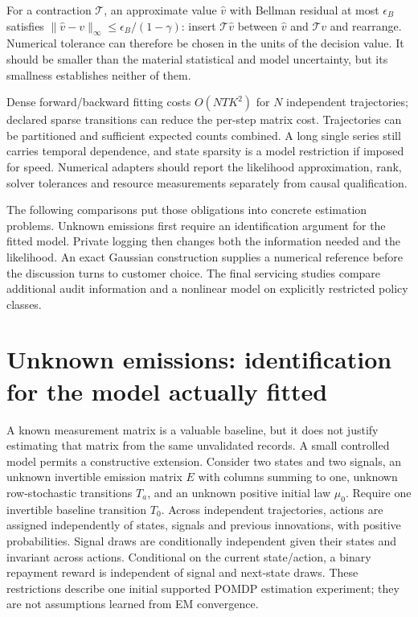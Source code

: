 For a contraction $\mathcal T$, an approximate value $\widehat v$
with Bellman residual at most $\epsilon_B$ satisfies
$\|\widehat v-v\|_\infty\le\epsilon_B/(1-\gamma)$: insert
$\mathcal T\widehat v$ between $\widehat v$ and $\mathcal Tv$
and rearrange. Numerical tolerance can therefore be chosen in the
units of the decision value. It should be smaller than the material
statistical and model uncertainty, but its smallness establishes
neither of them.

Dense forward/backward fitting costs $O(NTK^2)$ for $N$ independent
trajectories; declared sparse transitions can reduce the per-step
matrix cost. Trajectories can be partitioned and sufficient expected
counts combined. A long single series still carries temporal dependence,
and state sparsity is a model restriction if imposed for speed.
Numerical adapters should report the likelihood approximation, rank,
solver tolerances and resource measurements separately from causal
qualification.

The following comparisons put those obligations into concrete estimation
problems. Unknown emissions first require an identification argument for
the fitted model. Private logging then changes both the information needed
and the likelihood. An exact Gaussian construction supplies a numerical
reference before the discussion turns to customer choice. The final
servicing studies compare additional audit information and a nonlinear
model on explicitly restricted policy classes.



\section{Unknown emissions: identification for the model actually fitted}
\label{s4:unknown-emission}
A known measurement matrix is a valuable baseline, but it does not justify
estimating that matrix from the same unvalidated records. A small controlled
model permits a constructive extension. Consider two states and two signals,
an unknown invertible emission matrix $E$ with columns summing to one,
unknown row-stochastic transitions $T_a$, and an unknown positive initial
law $\mu_0$. Require one invertible baseline transition $T_0$. Across
independent trajectories, actions are assigned independently of states,
signals and previous innovations, with positive probabilities. Signal
draws are conditionally independent given their states and invariant across
actions. Conditional on the current state/action, a binary repayment reward
is independent of signal and next-state draws. These restrictions describe
one initial supported POMDP estimation experiment; they are not assumptions
learned from EM convergence.

